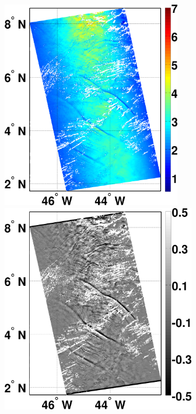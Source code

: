 \documentclass{report}
\begin{document}
\begin{figure}
\noindent\includegraphics[width=18.5pc]{fig1a}
\hfill
\noindent\includegraphics[width=20pc]{fig1b}

\end{figure}
\end{document}
